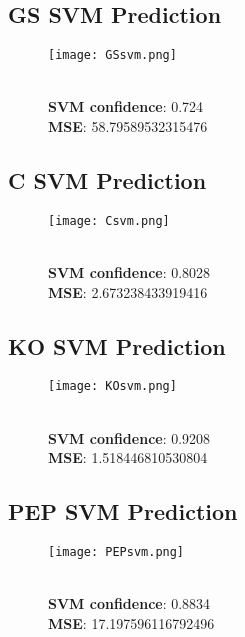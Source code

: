 \documentclass{report}
\begin{document}
\subsection{GS SVM Prediction}

\begin{figure}[h]
    \centering
    \texttt{[image: GSsvm.png]}
    \caption{\\ \textbf{SVM confidence}:  0.724 \\ \textbf{MSE}:  58.79589532315476}
\end{figure}

\subsection{C SVM Prediction}

\begin{figure}[h]
    \centering
    \texttt{[image: Csvm.png]}
    \caption{\\ \textbf{SVM confidence}:  0.8028 \\ \textbf{MSE}:  2.673238433919416}
\end{figure}\newpage

\subsection{KO SVM Prediction}

\begin{figure}[h]
    \centering
    \texttt{[image: KOsvm.png]}
    \caption{\\ \textbf{SVM confidence}:  0.9208 \\ \textbf{MSE}:  1.518446810530804}
\end{figure}

\subsection{PEP SVM Prediction}

\begin{figure}[h]
    \centering
    \texttt{[image: PEPsvm.png]}
    \caption{\\ \textbf{SVM confidence}:  0.8834 \\ \textbf{MSE}:  17.197596116792496}
\end{figure}

\end{document}
